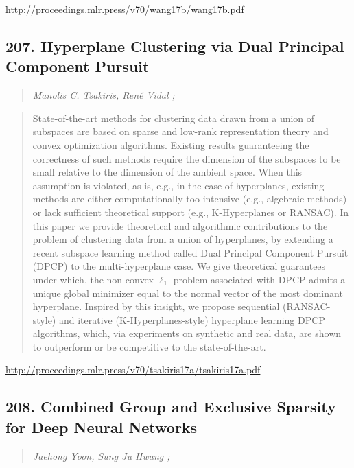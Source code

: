\documentclass{article}
\begin{document}
\href{http://proceedings.mlr.press/v70/wang17b/wang17b.pdf}{http://proceedings.mlr.press/v70/wang17b/wang17b.pdf}

\subsection{207. Hyperplane Clustering via Dual Principal Component Pursuit}

\begin{quote}
\footnotesize{\textit{Manolis C. Tsakiris, René Vidal ;}}
\end{quote}

\begin{quote}
    State-of-the-art methods for clustering data drawn from a union of subspaces are based on sparse and low-rank representation theory and convex optimization algorithms. Existing results guaranteeing the correctness of such methods require the dimension of the subspaces to be small relative to the dimension of the ambient space. When this assumption is violated, as is, e.g., in the case of hyperplanes, existing methods are either computationally too intensive (e.g., algebraic methods) or lack sufficient theoretical support (e.g., K-Hyperplanes or RANSAC). In this paper we provide theoretical and algorithmic contributions to the problem of clustering data from a union of hyperplanes, by extending a recent subspace learning method called Dual Principal Component Pursuit (DPCP) to the multi-hyperplane case. We give theoretical guarantees under which, the non-convex $\ell_1$ problem associated with DPCP admits a unique global minimizer equal to the normal vector of the most dominant hyperplane. Inspired by this insight, we propose sequential (RANSAC-style) and iterative (K-Hyperplanes-style) hyperplane learning DPCP algorithms, which, via experiments on synthetic and real data, are shown to outperform or be competitive to the state-of-the-art.  \end{quote}

\href{http://proceedings.mlr.press/v70/tsakiris17a/tsakiris17a.pdf}{http://proceedings.mlr.press/v70/tsakiris17a/tsakiris17a.pdf}

\subsection{208. Combined Group and Exclusive Sparsity for Deep Neural Networks}

\begin{quote}
\footnotesize{\textit{Jaehong Yoon, Sung Ju Hwang ;}}
\end{quote}
\end{document}
